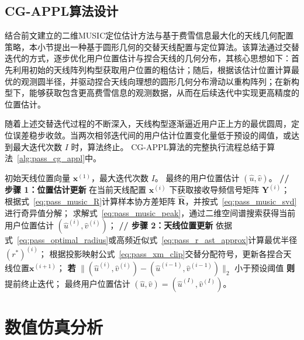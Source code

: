 \subsection{CG-APPL算法设计}

结合前文建立的二维MUSIC定位估计方法与基于费雪信息最大化的天线几何配置策略，本小节提出一种基于圆形几何的交替天线配置与定位算法。该算法通过交替迭代的方式，逐步优化用户位置估计与捏合天线的几何分布，其核心思想如下：首先利用初始的天线阵列构型获取用户位置的粗估计；随后，根据该估计位置计算最优的观测圆半径，并驱动捏合天线向理想的圆形几何分布滑动以重构阵列；在新构型下，能够获取包含更高费雪信息的观测数据，从而在后续迭代中实现更高精度的位置估计。

随着上述交替迭代过程的不断深入，天线构型逐渐逼近用户正上方的最优圆周，定位误差稳步收敛。当两次相邻迭代间的用户估计位置变化量低于预设的阈值，或达到最大迭代次数 $I$ 时，算法终止。
CG-APPL算法的完整执行流程总结于算法~\ref{alg:pass_cg_appl}中。

\begin{algorithm}[!htbp]
	\caption{基于圆形几何的交替天线配置与定位算法（CG-APPL）}
	\label{alg:pass_cg_appl}
	\begin{algorithmic}[1]
		\REQUIRE 初始天线位置向量 $\bm{x}^{(1)}$，最大迭代次数 $I$。
		\ENSURE 最终的用户位置估计 $(\hat{u}, \hat{v})$。
		\STATE \textbf{// 步骤 1：位置估计更新}
		\STATE 在当前天线配置 $\bm{x}^{(i)}$ 下获取接收导频信号矩阵 $\bm{Y}^{(i)}$；
		\STATE 根据式~\eqref{eq:pass_music_R}计算样本协方差矩阵 $\hat{\bm{R}}$，并按式~\eqref{eq:pass_music_svd}进行奇异值分解；
		\STATE 求解式~\eqref{eq:pass_music_peak}，通过二维空间谱搜索获得当前用户位置估计 $(\hat{u}^{(i)}, \hat{v}^{(i)})$；
		\STATE \textbf{// 步骤 2：天线位置更新}
		\STATE 依据式~\eqref{eq:pass_optimal_radius}或高频近似式~\eqref{eq:pass_r_ast_approx}计算最优半径 $(r^\ast)^{(i)}$；
		\STATE 根据投影映射公式~\eqref{eq:pass_xm_clip}交替分配符号，更新各捏合天线位置$\bm{x}^{(i+1)}$；
		\STATE \textbf{若} $\|(\hat{u}^{(i)}, \hat{v}^{(i)}) - (\hat{u}^{(i-1)}, \hat{v}^{(i-1)})\|_2$ 小于预设阈值 \textbf{则} 提前终止迭代；
		\ENDFOR
		\RETURN 最终用户位置估计 $(\hat{u}, \hat{v}) = (\hat{u}^{(I)}, \hat{v}^{(I)})$。
	\end{algorithmic}
\end{algorithm}


\section{数值仿真分析}\label{sec:pass_sim}

